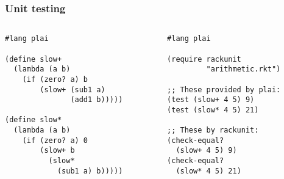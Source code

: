 \documentclass{beamer}
\newcommand{\bfr}[1]{\begin{frame}[fragile]\frametitle{{ #1 }}}
\newcommand{\cola}{\begin{columns}\begin{column}{0.5\textwidth}}
\newcommand{\colb}{\end{column}\begin{column}{0.5\textwidth}}
\newcommand{\colc}{\end{column}\end{columns}}
\begin{document}
\bfr{Unit testing}
\cola
\begin{lstlisting}[title=arithmetic.rkt]
#lang plai

(define slow+
  (lambda (a b)
    (if (zero? a) b
        (slow+ (sub1 a)
               (add1 b)))))

(define slow*
  (lambda (a b)
    (if (zero? a) 0
        (slow+ b 
          (slow* 
            (sub1 a) b)))))

\end{lstlisting}
\colb
\begin{lstlisting}[title=arithmetic-test.rkt]
#lang plai

(require rackunit
         "arithmetic.rkt")

;; These provided by plai:
(test (slow+ 4 5) 9)
(test (slow* 4 5) 21)

;; These by rackunit:
(check-equal?
  (slow+ 4 5) 9)
(check-equal?
  (slow* 4 5) 21)

\end{lstlisting}
\colc
\end{frame}
\end{document}
